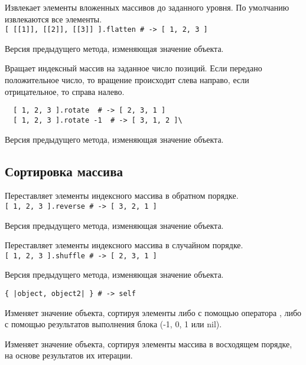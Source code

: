 \begin{methodlist}
  Извлекает элементы вложенных массивов до заданного уровня. По умолчанию извлекаются все элементы. 
  \\\verb![ [[1]], [[2]], [[3]] ].flatten # -> [ 1, 2, 3 ]!
 
  Версия предыдущего метода, изменяющая значение объекта. 

  Вращает индексный массив на заданное число позиций. Если передано положительное число, то вращение происходит слева направо, если отрицательное, то справа налево.
  \begin{verbatim}
  [ 1, 2, 3 ].rotate  # -> [ 2, 3, 1 ]
  [ 1, 2, 3 ].rotate -1  # -> [ 3, 1, 2 ]\
  \end{verbatim}

  Версия предыдущего метода, изменяющая значение объекта. 
\end{methodlist}

\subsection*{Сортировка массива}

\begin{methodlist}
  Переставляет элементы индексного массива в обратном порядке. 
  \\\verb![ 1, 2, 3 ].reverse # -> [ 3, 2, 1 ]!

  Версия предыдущего метода, изменяющая значение объекта. 

  Переставляет элементы индексного массива в случайном порядке. 
  \\\verb![ 1, 2, 3 ].shuffle # -> [ 2, 3, 1 ]!

  Версия предыдущего метода, изменяющая значение объекта. 

  \verb!{ |object, object2| } # -> self!

  Изменяет значение объекта, сортируя элементы либо с помощью оператора \method{<=>}, либо с помощью результатов выполнения блока (-1, 0, 1 или nil).

  Изменяет значение объекта, сортируя элементы массива в восходящем порядке, на основе результатов их итерации. 
\end{methodlist}

